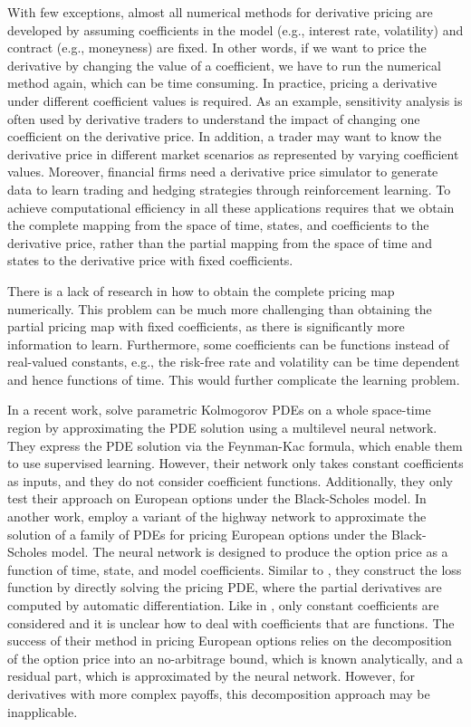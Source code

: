 \documentclass[11pt,a4paper]{article}
\theoremstyle{remark}
\begin{document}
	With few exceptions, almost all numerical methods for derivative pricing are developed by assuming coefficients in the model (e.g., interest rate, volatility) and contract (e.g., moneyness) are fixed. In other words, if we want to price the derivative by changing the value of a coefficient, we have to run the numerical method again, which can be time consuming. In practice, pricing a derivative under different coefficient values is required. As an example, sensitivity analysis is often used by derivative traders to understand the impact of changing one coefficient on the derivative price. In addition, a trader may want to know the derivative price in different market scenarios as represented by varying coefficient values. Moreover, financial firms need a derivative price simulator to generate data to learn trading and hedging strategies through reinforcement learning. To achieve computational efficiency in all these applications requires that we obtain the complete mapping from the space of time, states, and coefficients to the derivative price, rather than the partial mapping from the space of time and states to the derivative price with fixed coefficients. 
	
	There is a lack of research in how to obtain the complete pricing map numerically. This problem can be much more challenging than obtaining the partial pricing map with fixed coefficients, as there is significantly more information to learn. Furthermore, some coefficients can be functions instead of real-valued constants, e.g., the risk-free rate and volatility can be time dependent and hence functions of time. This would further complicate the learning problem.
	
	In a recent work, \cite{berner2020numerically} solve parametric Kolmogorov PDEs on a whole space-time region by approximating the PDE solution using a multilevel neural network. They express the PDE solution via the Feynman-Kac formula, which enable them to use supervised learning. However, their network only takes constant coefficients as inputs, and they do not consider coefficient functions. Additionally, they only test their approach on European options under the Black-Scholes model. In another work, \cite{glau2022deep} employ a variant of the highway network to approximate the solution of a family of PDEs for pricing European options under the Black-Scholes model. The neural network is designed to produce the option price as a function of time, state, and model coefficients. Similar to \cite{sirignano2018dgm}, they construct the loss function by directly solving the pricing PDE, where the partial derivatives are computed by automatic differentiation. Like in \cite{berner2020numerically}, only constant coefficients are considered and it is unclear how to deal with coefficients that are functions. The success of their method in pricing European options relies on the decomposition of the option price into an no-arbitrage bound, which is known analytically, and a residual part, which is approximated by the neural network. However, for derivatives with more complex payoffs, this decomposition approach may be inapplicable. 
	
\end{document}
